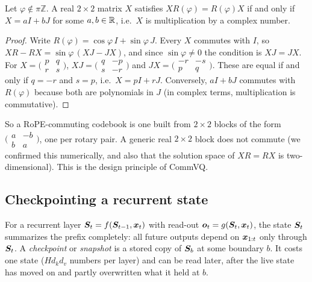 \begin{lemma}\label{lem:c13-commute}
Let $\varphi\notin\pi\mathbb{Z}$. A real $2\times2$ matrix $X$ satisfies $XR(\varphi)=R(\varphi)X$ if and
only if $X=aI+bJ$ for some $a,b\in\mathbb{R}$, i.e.\ $X$ is multiplication by a complex number.
\end{lemma}
\begin{proof}
Write $R(\varphi)=\cos\varphi\,I+\sin\varphi\,J$. Every $X$ commutes with $I$, so
$XR-RX=\sin\varphi\,(XJ-JX)$, and since $\sin\varphi\ne0$ the condition is $XJ=JX$. For
$X=\bigl(\begin{smallmatrix}p&q\\r&s\end{smallmatrix}\bigr)$,
$XJ=\bigl(\begin{smallmatrix}q&-p\\s&-r\end{smallmatrix}\bigr)$ and
$JX=\bigl(\begin{smallmatrix}-r&-s\\p&q\end{smallmatrix}\bigr)$. These are equal if and only if $q=-r$ and
$s=p$, i.e.\ $X=pI+rJ$. Conversely, $aI+bJ$ commutes with $R(\varphi)$ because both are polynomials in
$J$ (in complex terms, multiplication is commutative).
\end{proof}

So a RoPE-commuting codebook is one built from $2\times2$ blocks of the form
$\bigl(\begin{smallmatrix}a&-b\\b&a\end{smallmatrix}\bigr)$, one per rotary pair. A generic real
$2\times2$ block does not commute (we confirmed this numerically, and also that the solution space of
$XR=RX$ is two-dimensional). This is the design principle of CommVQ.

\subsection{Checkpointing a recurrent state}\label{sec:c13-checkpoint}

For a recurrent layer $\bm{S}_t=f(\bm{S}_{t-1},\bm{x}_t)$ with read-out $\bm{o}_t=g(\bm{S}_t,\bm{x}_t)$, the state $\bm{S}_t$
summarizes the prefix completely: all future outputs depend on $\bm{x}_{1:t}$ only through $\bm{S}_t$. A
\emph{checkpoint} or \emph{snapshot} is a stored copy of $\bm{S}_b$ at some boundary $b$. It costs one
state ($H d_kd_v$ numbers per layer) and can be read later, after the live state has moved on and
partly overwritten what it held at $b$.

